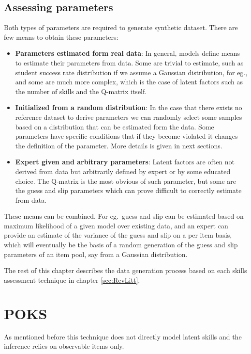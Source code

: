 \subsection{Assessing parameters}

Both types of parameters are required to generate synthetic dataset. There are few means to obtain these parameters:
\begin{itemize}
\item \textbf{Parameters estimated form real data}: In general, models define means to estimate their parameters from data.  Some are trivial to estimate, such as student success rate distribution if we assume a Gaussian distribution, for eg., and some are much more complex, which is the case of latent factors such as the number of skills and the Q-matrix itself.
\item \textbf{Initialized from a random distribution}: In the case that there exists no reference dataset to derive parameters we can randomly select some samples based on a distribution that can be estimated form the data. Some parameters have specific conditions that if they become violated it changes the definition of the parameter. More details is given in next sections.
\item \textbf{Expert given and arbitrary parameters}: Latent factors are often not derived from data but arbitrarily defined by expert or by some educated choice. The Q-matrix is the most obvious of such parameter, but some are the guess and slip parameters which can prove difficult to correctly estimate from data.

\end{itemize}

These means can be combined. For eg.\ guess and slip can be estimated based on maximum likelihood of a given model over existing data, and an expert can provide an estimate of the variance of the guess and slip on a per item basis, which will eventually be the basis of a random generation of the guess and slip parameters of an item pool, say from a Gaussian distribution.

The rest of this chapter describes the data generation process based on each skills assessment technique in chapter \ref{sec:RevLitt}.

\section{POKS}

As mentioned before this technique does not directly model latent skills and the inference relies on observable items only. 

